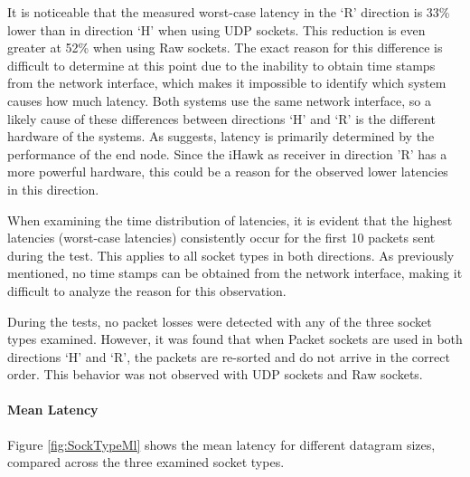 It is noticeable that the measured worst-case latency in the `R' direction is 33\% lower than in direction `H' when using UDP sockets. This reduction is even greater at 52\% when using Raw sockets. The exact reason for this difference is difficult to determine at this point due to the inability to obtain time stamps from the network interface, which makes it impossible to identify which system causes how much latency. Both systems use the same network interface, so a likely cause of these differences between directions `H' and `R' is the different hardware of the systems. As \cite{perfnew01} suggests, latency is primarily determined by the performance of the end node. Since the iHawk as receiver in direction 'R' has a more powerful hardware, this could be a reason for the observed lower latencies in this direction.

When examining the time distribution of latencies, it is evident that the highest latencies (worst-case latencies) consistently occur for the first 10 packets sent during the test. This applies to all socket types in both directions. As previously mentioned, no time stamps can be obtained from the network interface, making it difficult to analyze the reason for this observation.

During the tests, no packet losses were detected with any of the three socket types examined. However, it was found that when Packet sockets are used in both directions `H' and `R', the packets are re-sorted and do not arrive in the correct order. This behavior was not observed with UDP sockets and Raw sockets.

\paragraph{Mean Latency}

Figure \ref{fig:SockTypeMl} shows the mean latency for different datagram sizes, compared across the three examined socket types.


